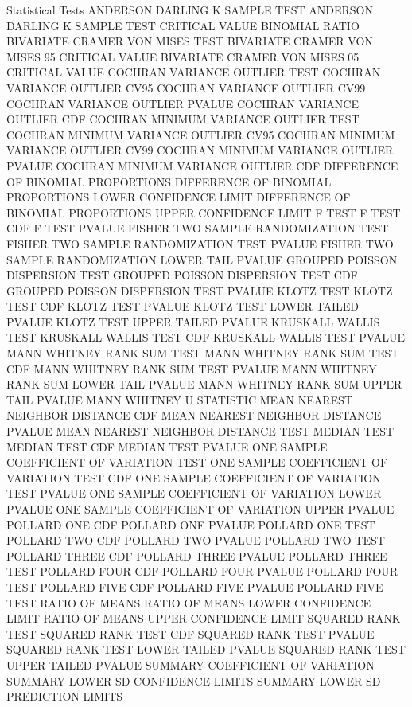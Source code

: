 Statistical Tests
   ANDERSON DARLING K SAMPLE TEST
   ANDERSON DARLING K SAMPLE TEST CRITICAL VALUE
   BINOMIAL RATIO
   BIVARIATE CRAMER VON MISES TEST
   BIVARIATE CRAMER VON MISES 95 CRITICAL VALUE
   BIVARIATE CRAMER VON MISES 05 CRITICAL VALUE
   COCHRAN VARIANCE OUTLIER TEST
   COCHRAN VARIANCE OUTLIER CV95
   COCHRAN VARIANCE OUTLIER CV99
   COCHRAN VARIANCE OUTLIER PVALUE
   COCHRAN VARIANCE OUTLIER CDF
   COCHRAN MINIMUM VARIANCE OUTLIER TEST
   COCHRAN MINIMUM VARIANCE OUTLIER CV95
   COCHRAN MINIMUM VARIANCE OUTLIER CV99
   COCHRAN MINIMUM VARIANCE OUTLIER PVALUE
   COCHRAN MINIMUM VARIANCE OUTLIER CDF
   DIFFERENCE OF BINOMIAL PROPORTIONS
   DIFFERENCE OF BINOMIAL PROPORTIONS LOWER CONFIDENCE LIMIT
   DIFFERENCE OF BINOMIAL PROPORTIONS UPPER CONFIDENCE LIMIT
   F TEST
   F TEST CDF
   F TEST PVALUE
   FISHER TWO SAMPLE RANDOMIZATION TEST
   FISHER TWO SAMPLE RANDOMIZATION TEST PVALUE
   FISHER TWO SAMPLE RANDOMIZATION LOWER TAIL PVALUE
   GROUPED POISSON DISPERSION TEST
   GROUPED POISSON DISPERSION TEST CDF
   GROUPED POISSON DISPERSION TEST PVALUE
   KLOTZ TEST
   KLOTZ TEST CDF
   KLOTZ TEST PVALUE
   KLOTZ TEST LOWER TAILED PVALUE
   KLOTZ TEST UPPER TAILED PVALUE
   KRUSKALL WALLIS TEST
   KRUSKALL WALLIS TEST CDF
   KRUSKALL WALLIS TEST PVALUE
   MANN WHITNEY RANK SUM TEST
   MANN WHITNEY RANK SUM TEST CDF
   MANN WHITNEY RANK SUM TEST PVALUE
   MANN WHITNEY RANK SUM LOWER TAIL PVALUE
   MANN WHITNEY RANK SUM UPPER TAIL PVALUE
   MANN WHITNEY U STATISTIC
   MEAN NEAREST NEIGHBOR DISTANCE CDF
   MEAN NEAREST NEIGHBOR DISTANCE PVALUE
   MEAN NEAREST NEIGHBOR DISTANCE TEST
   MEDIAN TEST
   MEDIAN TEST CDF
   MEDIAN TEST PVALUE
   ONE SAMPLE COEFFICIENT OF VARIATION TEST
   ONE SAMPLE COEFFICIENT OF VARIATION TEST CDF
   ONE SAMPLE COEFFICIENT OF VARIATION TEST PVALUE
   ONE SAMPLE COEFFICIENT OF VARIATION LOWER PVALUE
   ONE SAMPLE COEFFICIENT OF VARIATION UPPER PVALUE
   POLLARD ONE CDF
   POLLARD ONE PVALUE
   POLLARD ONE TEST
   POLLARD TWO CDF
   POLLARD TWO PVALUE
   POLLARD TWO TEST
   POLLARD THREE CDF
   POLLARD THREE PVALUE
   POLLARD THREE TEST
   POLLARD FOUR CDF
   POLLARD FOUR PVALUE
   POLLARD FOUR TEST
   POLLARD FIVE CDF
   POLLARD FIVE PVALUE
   POLLARD FIVE TEST
   RATIO OF MEANS
   RATIO OF MEANS LOWER CONFIDENCE LIMIT
   RATIO OF MEANS UPPER CONFIDENCE LIMIT
   SQUARED RANK TEST
   SQUARED RANK TEST CDF
   SQUARED RANK TEST PVALUE
   SQUARED RANK TEST LOWER TAILED PVALUE
   SQUARED RANK TEST UPPER TAILED PVALUE
   SUMMARY COEFFICIENT OF VARIATION
   SUMMARY LOWER SD CONFIDENCE LIMITS
   SUMMARY LOWER SD PREDICTION LIMITS
